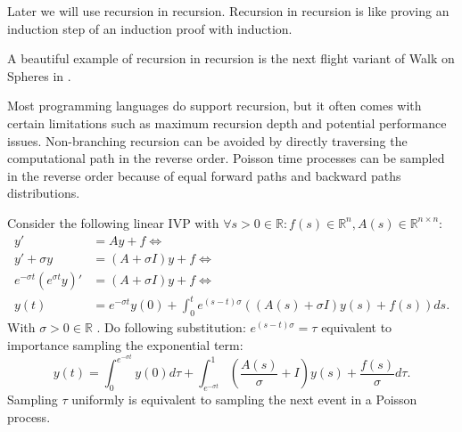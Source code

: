 \documentclass[a4paper,12pt]{article}
\begin{document}
\begin{technique}\label{tech:recu in recu}
  Later we will use recursion in recursion.
  Recursion in recursion is like proving an induction
  step of an induction proof with induction.
\end{technique}

\begin{related}
  A beautiful example of recursion in recursion is
  the next flight variant of Walk on Spheres in
  \cite{sawhney_grid-free_2022}.
\end{related}

Most programming languages do support recursion, but it often comes with certain
limitations such as maximum recursion depth and potential performance issues.
Non-branching recursion can be avoided by directly traversing the computational path in the
reverse order. Poisson time processes can be sampled in the reverse order
because of equal forward paths and backward paths distributions.

\begin{definition} \label{def:main poisson}
  Consider the following linear IVP with $\forall s>0 \in \mathbb{R}: f(s) \in \mathbb{R}^{n}, A(s) \in \mathbb{R}^{n \times n}$:
  \begin{align}
    y'                              & = A y + f \Leftrightarrow                                                                             \\
    y'+\sigma y                     & = (A + \sigma I) y + f\Leftrightarrow                                                                 \\
    e^{-\sigma t} ( e^{\sigma t}y)' & = (A + \sigma I) y + f  \Leftrightarrow                                                               \\
    y(t)                            & = e^{-\sigma t} y(0) + \int_{0}^{t} e^{(s-t) \sigma} \left(  (A(s) + \sigma I ) y(s) +f(s)\right) ds.
  \end{align}
  With $\sigma>0 \in \mathbb{R}$ . Do following substitution: $e^{(s-t)\sigma} = \tau$ equivalent to importance sampling
  the exponential term:
  \begin{equation} \label{eq:poisson main}
    y(t) = \int_{0}^{e^{-\sigma t}}  y(0) d\tau + \int_{e^{-\sigma t}}^{1} \left(  \frac{A(s)}{\sigma} + I\right)  y(s) + \frac{f(s)}{\sigma} d\tau
    .
  \end{equation}
  Sampling $\tau$ uniformly is equivalent to sampling the next event in a Poisson process.
\end{definition}
\end{document}
